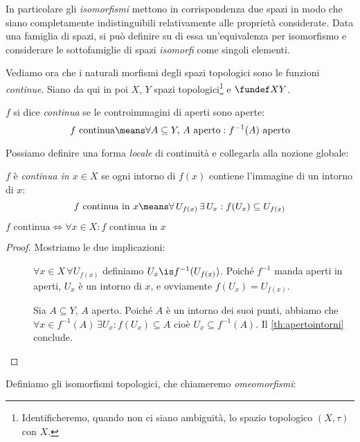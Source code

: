 In particolare gli \emph{isomorfismi} mettono in corrispondenza due spazi in modo che siano completamente indistinguibili relativamente alle proprietà considerate. Data una famiglia di spazi, si può definire su di essa un'equivalenza per isomorfismo e considerare le sottofamiglie di spazi \emph{isomorfi} come singoli elementi.

Vediamo ora che i naturali morfismi degli spazi topologici sono le funzioni \emph{continue}. Siano da qui in poi $X$, $Y$ spazi topologici\footnote{Identificheremo, quando non ci siano ambiguità, lo spazio topologico $(X,\tau)$ con $X$.} e $\fundef XY$.

\begin{defn}[Continuità]
	$f$ si dice \emph{continua} se le controimmagini di aperti sono aperte:
	\[f\text{ continua}\means
	\forall A\subseteq Y,\,A\text{ aperto}:f^{-1}(A)\text{ aperto}\]
\end{defn}

Possiamo definire una forma \emph{locale} di continuità e collegarla alla nozione globale:

\begin{defn}
	$f$ è \emph{continua in $x\in X$} se ogni intorno di $f(x)$ contiene l'immagine di un intorno di $x$:
	\[f\text{ continua in }x\means
	\forall\, U_{f(x)}\,\exists\, U_x:f(U_x)\subseteq U_{f(x)}\]
\end{defn}

\begin{prop}
	$f\text{ continua}\iff\forall x\in X:f\text{ continua in }x$
\end{prop}

\begin{proof}
	Mostriamo le due implicazioni:
	\begin{description}
		\item[\proofrightarrow]
			$\forall x\in X\,\forall U_{f(x)}$ definiamo $U_x\is f^{-1}(U_{f(x)})$.
			Poiché $f^{-1}$ manda aperti in aperti, $U_x$ è un intorno di $x$,
			e ovviamente $f(U_x)=U_{f(x)}$.
		\item[\proofleftarrow]
			Sia  $A\subseteq Y$, $A$ aperto.
			Poiché $A$ è un intorno dei suoi punti, abbiamo che
			$\forall x\in f^{-1}(A)\,\exists U_x:f(U_x)\subseteq A$ cioè
			$U_x\subseteq f^{-1}(A)$.
			Il \autoref{th:apertointorni} conclude.
			\qedhere
	\end{description}
\end{proof}

Definiamo gli isomorfismi topologici, che chiameremo \emph{omeomorfismi}:

